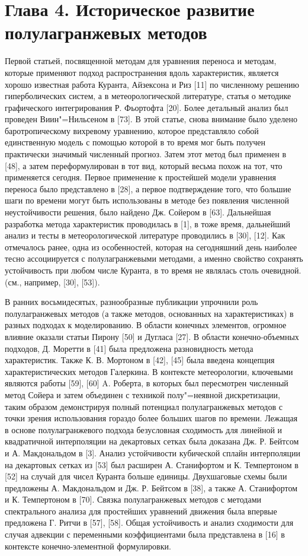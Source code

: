 \chapter*{Глава 4. Историческое развитие полулагранжевых методов} \label{chapt_4}
Первой статьей, посвященной методам для уравнения переноса и методам, которые применяют подход распространения вдоль характеристик, является хорошо известная работа Куранта, Айзексона и Риз [11] по численному решению гиперболических систем, а в метеорологической литературе, статья о методике графического интегрирования Р. Фьортофта [20]. Более детальный анализ был проведен Виин"=Нильсеном в [73]. В этой статье, снова внимание было уделено баротропическому вихревому уравнению, которое представляло собой единственную модель с помощью которой в то время мог быть получен практически значимый численный прогноз. Затем этот метод был применен в [48], а затем переформулирован в тот вид, который весьма похож на тот, что применяется сегодня. Первое применение к простейшей модели уравнения переноса было представлено в [28], а первое подтверждение того, что большие шаги по времени могут быть использованы в методе без появления численной неустойчивости решения, было найдено Дж. Сойером в [63]. Дальнейшая разработка метода характеристик проводилась в [1], в тоже время, дальнейший анализ и тесты в метеорологической литературе проводились в [30], [12]. Как отмечалось ранее, одна из особенностей, которая на сегодняшний день наиболее тесно ассоциируется с полулагранжевыми методами, а именно свойство сохранять устойчивость при любом числе Куранта, в то время не являлась столь очевидной. (см., например, [30], [53]).

В ранних восьмидесятых, разнообразные публикации упрочнили роль полулагранжевых методов (а также методов, основанных на характеристиках) в разных подходах к моделированию. В области конечных элементов, огромное влияние оказали статьи Пирону [50] и Дугласа [27]. В области конечно-объемных подходов, Д. Моретти в [41] была предложена разновидность метода характеристик. Также К. В. Мортоном в [42], [45] была введена концепция характеристических методов Галеркина. В контексте метеорологии, ключевыми являются работы [59], [60] A. Роберта, в которых был пересмотрен численный метод Сойера и затем объединен с техникой полу"=неявной дискретизации, таким образом демонстрируя полный потенциал полулагранжевых методов с точки зрения использования гораздо более больших шагов по времени. Лежащая в основе полулагранжевого подхода безусловная сходимость для линейной и квадратичной интерполяции на декартовых сетках была доказана Дж. Р. Бейтсом и А. Макдональдом в [3]. Анализ устойчивости кубической сплайн интерполяции на декартовых сетках из [53] был расширен А. Станифортом и К. Темпертоном в [52] на случай для чисел Куранта больше единицы. Двухшаговые схемы были предложены А. Макдональдом и Дж. Р. Бейтсом в [38], а также А. Станифортом и К. Темпертоном в [70]. Связка полулагранжевых методов с методами спектрального анализа для простейших уравнений движения была впервые предложена Г. Ритчи в [57], [58]. Общая устойчивость и анализ сходимости для случая адвекции с переменными коэффициентами была представлена в [16] в контексте конечно-элементной формулировки.

